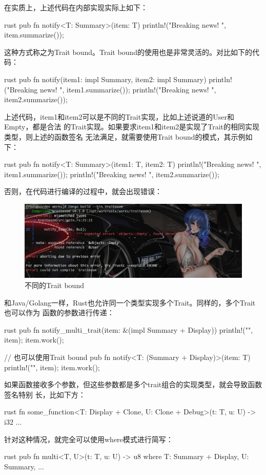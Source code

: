 在实质上，上述代码在内部实现实际上如下：
\begin{code-block}{rust}
pub fn notify<T: Summary>(item: T) {
    println!("Breaking news! {}", item.summarize());
}
\end{code-block}
这种方式称之为Trait bound。Trait bound的使用也是非常灵活的。对比如下的代码：
\begin{code-block}{rust}
pub fn notify(item1: impl Summary, item2: impl Summary) {
    println!("Breaking news! {}", item1.summarize());
    println!("Breaking news! {}", item2.summarize());
}
\end{code-block}
上述代码，item1和item2可以是不同的Trait实现，比如上述说道的User和Empty，都是合法
的Trait实现。如果要求item1和item2是实现了Trait的相同实现类型，则上述的函数签名
无法满足，就需要使用Trait bound的模式，其示例如下：
\begin{code-block}{rust}
pub fn notify<T: Summary>(item1: T, item2: T) {
    println!("Breaking news! {}", item1.summarize());
    println!("Breaking news! {}", item2.summarize());
}
\end{code-block}
否则，在代码进行编译的过程中，就会出现错误：
\begin{figure}[H]
  \centering
  \includegraphics[scale=0.3]{rust_trait_bound.png}
  \caption{不同的Trait bound}
  \label{fig:rust_trait_bound}
\end{figure}

和Java/Golang一样，Rust也允许同一个类型实现多个Trait。同样的，多个Trait也可以作为
函数的参数进行传递：
\begin{code-block}{rust}
pub fn notify_multi_trait(item: &(impl Summary + Display)) {
    println!("{}", item);
    item.work();
}

// 也可以使用Trait bound
pub fn notify<T: (Summary + Display)>(item: T) {
    println!("{}", item);
    item.work();
}
\end{code-block}

如果函数接收多个参数，但这些参数都是多个trait组合的实现类型，就会导致函数签名特别
长，比如下方：
\begin{code-block}{rust}
fn some_function<T: Display + Clone, U: Clone + Debug>(t: T, u: U) -> i32 {
    ...
}
\end{code-block}
针对这种情况，就完全可以使用where模式进行简写：
\begin{code-block}{rust}
pub fn multi<T, U>(t: T, u: U) -> u8
where
    T: Summary + Display,
    U: Summary,
{
    ...
}
\end{code-block}

